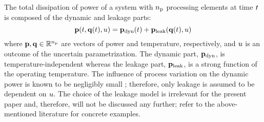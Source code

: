 The total dissipation of power of a system with ${n_\text{p}}$ processing elements at time $t$ is composed of the dynamic and leakage parts:
\begin{equation} \elabel{total-power}
  \vP(\t, \vT(\t), \u) = \vP_\dyn(\t) + \vP_\leak(\vT(\t), \u)
\end{equation}
where $\mathbf{p}, \mathbf{q} \in \mathbb{R}^{n_\text{p}}$ are vectors of power and temperature, respectively, and $u$ is an outcome of the uncertain parametrization. The dynamic part, $\mathbf{p}_{\text{dyn}}$, is temperature-independent whereas the leakage part, $\mathbf{p}_{\text{leak}}$, is a strong function of the operating temperature.
The influence of process variation on the dynamic power is known to be negligibly small \cite{srivastava2010, juan2011, juan2012}; therefore, only leakage is assumed to be dependent on $u$.
The choice of the leakage model is irrelevant for the present paper and, therefore, will not be discussed any further; refer to the above-mentioned literature for concrete examples.
